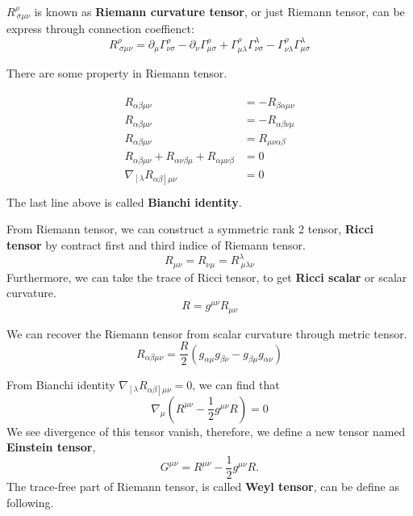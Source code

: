 \documentclass[12pt]{article}
\theoremstyle{mystyle}{\newtheorem{definition}{Definition}[section]}
\theoremstyle{mystyle}{\newtheorem{theorem}[definition]{Theorem}}
\theoremstyle{mystyle}{\newtheorem*{remark}{Remark}}
\theoremstyle{mystyle}{\newtheorem*{example}{Example}}
\theoremstyle{mystyle}{\newtheorem*{examples}{Examples}}
\theoremstyle{cstyle}{\newtheorem*{cthm}{}}
\begin{document}
\begin{definition}
  \(R^{\rho}_{\ \sigma\mu\nu}\) is known as \textbf{Riemann curvature tensor}, or just Riemann tensor,
  can be express through connection coeffienct: \[R^{\rho}_{\ \sigma\mu\nu} =
    \partial_{\mu} \Gamma^{\rho}_{\nu\sigma} -
    \partial_{\nu} \Gamma^{\rho}_{\mu\sigma} +
    \Gamma^{\rho}_{\mu\lambda}\Gamma^{\lambda}_{\nu\sigma} -
    \Gamma^{\rho}_{\nu\lambda}\Gamma^{\lambda}_{\mu\sigma}
  \]
\end{definition}
There are some property in Riemann tensor.

\begin{cthm}
  \begin{align*}
    \begin{split}
      R_{\alpha\beta\mu\nu} &= -R_{\beta\alpha\mu\nu}\\
      R_{\alpha\beta\mu\nu} &= -R_{\alpha\beta\nu\mu}\\
      R_{\alpha\beta\mu\nu} &= R_{\mu\nu\alpha\beta}\\
      R_{\alpha\beta\mu\nu} + R_{\alpha\nu\beta\mu} + R_{\alpha\mu\nu\beta} &= 0 \\
      \nabla_{\left[ \lambda \right.} R_{\left.\alpha\beta \right] \mu\nu} &= 0 \\
    \end{split}
  \end{align*}
  The last line above is called \textbf{Bianchi identity}.
\end{cthm}

\begin{definition}
  From Riemann tensor, we can construct a symmetric rank 2 tensor, \textbf{Ricci tensor}
  by contract first and third indice of Riemann tensor.
  \[R_{\mu\nu} = R_{\nu\mu} = R^{\lambda}_{\ \mu\lambda\nu}\]
  Furthermore, we can take the trace of Ricci tensor, to get \textbf{Ricci scalar} or scalar curvature.
  \[R = g^{\mu\nu}R_{\mu\nu}\]
\end{definition}

We can recover the Riemann tensor from scalar curvature through metric tensor.
\[R_{\alpha\beta\mu\nu} = \frac{R}{2}(g_{\alpha\mu}g_{\beta\nu}-g_{\beta\mu}g_{\alpha\nu})\]

From Bianchi identity \(\nabla_{\left[ \lambda \right.} R_{\left.\alpha\beta \right] \mu\nu} = 0\), 
we can find that \[\nabla_{\mu}(R^{\mu\nu}-\frac{1}{2}g^{\mu\nu}R) = 0\]
We see divergence of this tensor vanish, therefore, we define a new tensor named \textbf{Einstein tensor},
\[G^{\mu\nu}=R^{\mu\nu}-\frac{1}{2}g^{\mu\nu}R. \]
The trace-free part of Riemann tensor, is called \textbf{Weyl tensor}, can be define as following.
\end{document}
